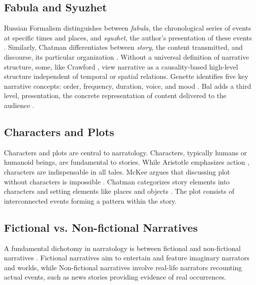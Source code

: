 \subsection{Fabula and Syuzhet}\label{II-subsec:fabulaAndSyzhet}

Russian Formalism distinguishes between \emph{fabula}, the chronological series of events at specific times and places, and \emph{syuzhet}, the author's presentation of these events \cite{proppMorphologyFolktale1968,lemonRussianFormalistCriticism1965}. Similarly, Chatman differentiates between \emph{story}, the content transmitted, and discourse, its particular organization \cite{chatmanCharactersNarratorsFilter1986}. Without a universal definition of narrative structure, some, like Crawford \cite{crawfordChrisCrawfordInteractive2012}, view narrative as a causality-based high-level structure independent of temporal or spatial relations. Genette identifies five key narrative concepts: order, frequency, duration, voice, and mood \cite{genetteNarrativeDiscourseEssay1990}. Bal adds a third level, presentation, the concrete representation of content delivered to the audience \cite{balNarratologyIntroductionTheory1997}.

\subsection{Characters and Plots}\label{II-subsec:charactersAndPlots}

Characters and plots are central to narratology. Characters, typically humans or humanoid beings, are fundamental to stories. While Aristotle emphasizes action \cite{aristotelesPoetica2010}, characters are indispensable in all tales. McKee argues that discussing plot without characters is impossible \cite{mckeeStorySubstanceStructure1997}. Chatman categorizes story elements into characters and setting elements like places and objects \cite{chatmanStoryDiscourseNarrative1978}. The plot consists of interconnected events forming a pattern within the story.

\subsection{Fictional vs. Non-fictional Narratives}\label{II-subsec:fictionalNonFictional}

A fundamental dichotomy in narratology is between fictional and non-fictional narratives \cite{jahnNarratology23Guide2021}. Fictional narratives aim to entertain and feature imaginary narrators and worlds, while Non-fictional narratives involve real-life narrators recounting actual events, such as news stories providing evidence of real occurrences.

